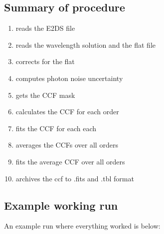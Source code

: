 \subsection{Summary of procedure}
\begin{enumerate}
\item reads the E2DS file
\item reads the wavelength solution and the flat file
\item corrects for the flat
\item computes photon noise uncertainty
\item gets the CCF mask
\item calculates the CCF for each order
\item fits the CCF for each each
\item averages the CCFs over all orders
\item fits the average CCF over all orders
\item archives the ccf to .fits and .tbl format
\end{enumerate}


\newpage
\subsection{Example working run}

An example run where everything worked is below:

